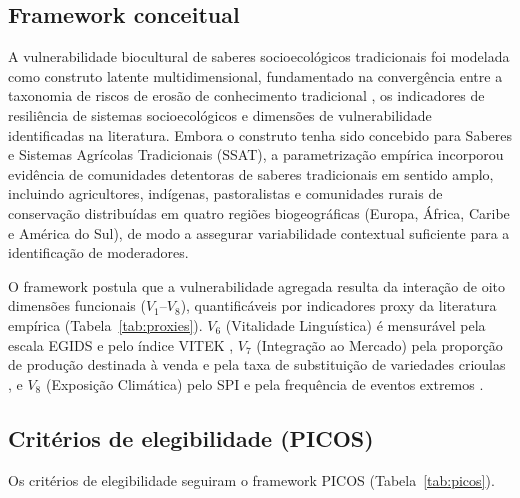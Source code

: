 \documentclass[12pt,a4paper]{article}
\begin{document}
\subsection{Framework conceitual}
\label{sec:framework}

A vulnerabilidade biocultural de saberes socioecológicos tradicionais foi modelada como construto latente multidimensional, fundamentado na convergência entre a taxonomia de riscos de erosão de conhecimento tradicional \citep{Agrawal2002}, os indicadores de resiliência de sistemas socioecológicos \citep{Folke2016} e dimensões de vulnerabilidade identificadas na literatura. Embora o construto tenha sido concebido para Saberes e Sistemas Agrícolas Tradicionais (SSAT), a parametrização empírica incorporou evidência de comunidades detentoras de saberes tradicionais em sentido amplo, incluindo agricultores, indígenas, pastoralistas e comunidades rurais de conservação distribuídas em quatro regiões biogeográficas (Europa, África, Caribe e América do Sul), de modo a assegurar variabilidade contextual suficiente para a identificação de moderadores.

O framework postula que a vulnerabilidade agregada resulta da interação de oito dimensões funcionais ($V_1$--$V_8$), quantificáveis por indicadores proxy da literatura empírica (Tabela~\ref{tab:proxies}). $V_6$ (Vitalidade Linguística) é mensurável pela escala EGIDS \citep{LewisSiomns2010} e pelo índice VITEK \citep{ZentMaffi2009}, $V_7$ (Integração ao Mercado) pela proporção de produção destinada à venda e pela taxa de substituição de variedades crioulas \citep{Godoy2005,ReyesGarcia2013}, e $V_8$ (Exposição Climática) pelo SPI e pela frequência de eventos extremos \citep{Savo2016}.

\subsection{Critérios de elegibilidade (PICOS)}
\label{sec:picos}

Os critérios de elegibilidade seguiram o framework PICOS (Tabela~\ref{tab:picos}).
\end{document}
